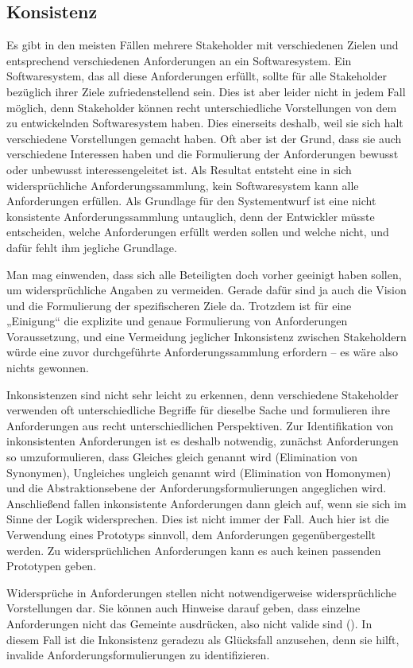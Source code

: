 \subsection{Konsistenz}
\label{sec:Kap-6.4.2}

Es gibt in den meisten Fällen mehrere Stakeholder mit verschiedenen Zielen und entsprechend verschiedenen Anforderungen an ein Softwaresystem. Ein Software\-system, das all diese Anforderungen erfüllt, sollte für alle Stakeholder bezüglich ihrer Ziele zufriedenstellend sein. Dies ist aber leider nicht in jedem Fall möglich, denn Stake\-holder können recht unterschiedliche Vorstellungen von dem zu entwickelnden Softwaresystem haben. Dies einerseits deshalb, weil sie sich halt verschiedene Vorstellungen gemacht haben. Oft aber ist der Grund, dass sie auch verschiedene Interessen haben und die Formulierung der Anforderungen bewusst oder unbewusst interessengeleitet ist. Als Resultat entsteht eine in sich widersprüchliche Anforderungssammlung, kein Softwaresystem kann alle Anforderungen erfüllen. Als Grundlage für den Systementwurf ist eine nicht konsistente Anforderungssammlung untauglich, denn der Entwickler müsste entscheiden, welche Anforderungen erfüllt werden sollen und welche nicht, und dafür fehlt ihm jegliche Grundlage.

Man mag einwenden, dass sich alle Beteiligten doch vorher geeinigt haben sollen, um widersprüchliche Angaben zu vermeiden. Gerade dafür sind ja auch die Vision und die Formulierung der spezifischeren Ziele da. Trotzdem ist für eine „Einigung“ die explizite und genaue Formulierung von Anforderungen Voraussetzung, und eine Vermeidung jeglicher Inkonsistenz zwischen Stakeholdern würde eine zuvor durchgeführte Anforderungssammlung erfordern – es wäre also nichts gewonnen.

Inkonsistenzen sind nicht sehr leicht zu erkennen, denn verschiedene Stakeholder verwenden oft unterschiedliche Begriffe für dieselbe Sache und formulieren ihre Anforderungen aus recht unterschiedlichen Perspektiven. Zur Identifikation von inkonsistenten Anforderungen ist es deshalb notwendig, zunächst Anforderungen so umzuformulieren, dass Gleiches gleich genannt wird (Elimination von Synonymen), Ungleiches ungleich genannt wird (Elimination von Homonymen) und die Abstraktionsebene der Anforderungsformulierungen angeglichen wird. Anschließend fallen inkonsistente Anforderungen dann gleich auf, wenn sie sich im Sinne der Logik widersprechen. Dies ist nicht immer der Fall. Auch hier ist die Verwendung eines Prototyps sinnvoll, dem Anforderungen gegenübergestellt werden. Zu widersprüchlichen Anforderungen kann es auch keinen passenden Prototypen geben.

Widersprüche in Anforderungen stellen nicht notwendigerweise widersprüchliche Vorstellungen dar. Sie können auch Hinweise darauf geben, dass einzelne Anforderungen nicht das Gemeinte ausdrücken, also nicht valide sind (\so). In diesem Fall ist die Inkonsistenz geradezu als Glücksfall anzusehen, denn sie hilft, invalide Anforderungsformulierungen zu identifizieren.